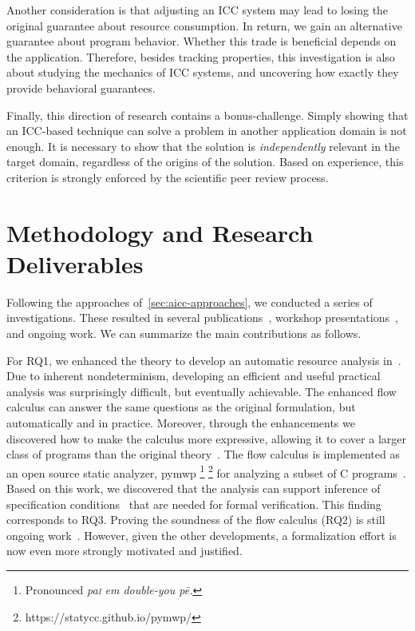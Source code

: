 Another consideration is that adjusting an ICC system may lead to losing the
original guarantee about resource consumption. In return, we gain an alternative
guarantee about program behavior. Whether this trade is beneficial depends on
the application. Therefore, besides tracking properties, this investigation is
also about studying the mechanics of ICC systems, and uncovering how exactly
they provide behavioral guarantees.

Finally, this direction of research contains a bonus\hyp{}challenge. Simply
showing that an ICC-based technique can solve a problem in another application
domain is not enough. It is necessary to show that the solution is
\emph{independently} relevant in the target domain, regardless of the origins of
the solution. Based on experience, this criterion is strongly enforced by the
scientific peer review process.

\section{Methodology and Research Deliverables}
\label{sec:aicc-methods}

Following the approaches of~\autoref{sec:aicc-approaches}, we conducted a series
of investigations. These resulted in several
publications~\cite{aubert20222,aubert20232,aubert2023b}, workshop
presentations~\cite{aubert20231,aubert202217,splash22}, and ongoing work.
We can summarize the main contributions as follows.

For RQ1, we enhanced the theory to develop an automatic resource analysis
in~\cite{aubert20222,aubert2023b,rusch2025}. Due to inherent
nondeterminism, developing an efficient and useful
practical analysis was surprisingly difficult, but eventually achievable. The
enhanced flow calculus can answer the same questions as the original
formulation, but automatically and in practice. Moreover, through the
enhancements we discovered how to make the calculus more expressive, allowing it
to cover a larger class of programs than the original theory~\cite{rusch2025}.
The flow calculus is implemented as an open source static analyzer,
pymwp%
\footnote{Pronounced \emph{pa\textsc{i} em double-you p\={e}.}}%
\footnote{https://statycc.github.io/pymwp/}
for analyzing a subset
of C programs~\cite{aubert2023b}. Based on this work, we discovered that the
analysis can support inference of specification conditions~\cite{rusch2025} that
are needed for formal verification. This finding corresponds to RQ3. Proving the
soundness of the flow calculus (RQ2) is still
ongoing work~\cite{aubert20232}. However, given the other developments, a
formalization effort is now even more strongly motivated and justified.

